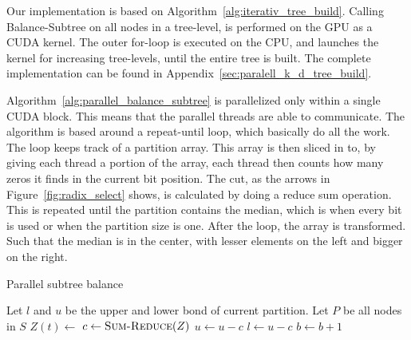Our implementation is based on Algorithm~\ref{alg:iterativ_tree_build}. Calling Balance-Subtree on all nodes in a tree-level, is performed on the GPU as a CUDA kernel. The outer for-loop is executed on the CPU, and launches the kernel for increasing tree-levels, until the entire tree is built. The complete implementation can be found in Appendix~\ref{sec:paralell_k_d_tree_build}.

Algorithm~\ref{alg:parallel_balance_subtree} is parallelized only within a single CUDA block. This means that the parallel threads are able to communicate. The algorithm is based around a repeat-until loop, which basically do all the work. The loop keeps track of a partition array. This array is then sliced in to, by giving each thread a portion of the array, each thread then counts how many zeros it finds in the current bit position. The cut, as the arrows in Figure~\ref{fig:radix_select} shows, is calculated by doing a reduce sum operation\citep{parallel_reduction_in_cuda}. This is repeated until the partition contains the median, which is when every bit is used or when the partition size is one. After the loop, the array is transformed. Such that the median is in the center, with lesser elements on the left and bigger on the right.

\begin{algorithm}[ht]
\caption{Parallel subtree balance}
\label{alg:parallel_balance_subtree}
\begin{algorithmic}
        \State Let $l$ and $u$ be the upper and lower bond of current partition.
        \State Let $P$ be all nodes in $S$
        \Repeat
                \State $Z(t) \gets $  
            \EndFor
            \State $c \gets \Call{Sum-Reduce}{Z}$ 
                \State$ u \gets u-c$
            \Else
                \State$l \gets u-c$
            \EndIf
            \State $b \gets b+1$ 
            \State {}
        \State {}
    \EndFunction
\end{algorithmic}
\end{algorithm}

